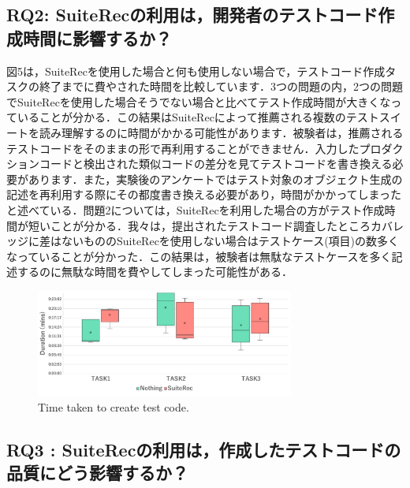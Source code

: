 \documentclass[conference]{IEEEtran}
\begin{document}
\subsection{RQ2: SuiteRecの利用は，開発者のテストコード作成時間に影響するか？}

図5は，SuiteRecを使用した場合と何も使用しない場合で，テストコード作成タスクの終了までに費やされた時間を比較しています．3つの問題の内，2つの問題でSuiteRecを使用した場合そうでない場合と比べてテスト作成時間が大きくなっていることが分かる．この結果はSuiteRecによって推薦される複数のテストスイートを読み理解するのに時間がかかる可能性があります．被験者は，推薦されるテストコードをそのままの形で再利用することができません．入力したプロダクションコードと検出された類似コードの差分を見てテストコードを書き換える必要があります．また，実験後のアンケートではテスト対象のオブジェクト生成の記述を再利用する際にその都度書き換える必要があり，時間がかかってしまったと述べている．問題2については，SuiteRecを利用した場合の方がテスト作成時間が短いことが分かる．我々は，提出されたテストコード調査したところカバレッジに差はないもののSuiteRecを使用しない場合はテストケース(項目)の数多くなっていることが分かった．この結果は，被験者は無駄なテストケースを多く記述するのに無駄な時間を費やしてしまった可能性がある．
\begin{figure}[htbp]
\centerline{\includegraphics[width=8.5cm]{duration.pdf}}
\caption{Time taken to create test code.}
\label{fig6}
\end{figure}

\subsection{RQ3 : SuiteRecの利用は，作成したテストコードの品質にどう影響するか？}
\end{document}
